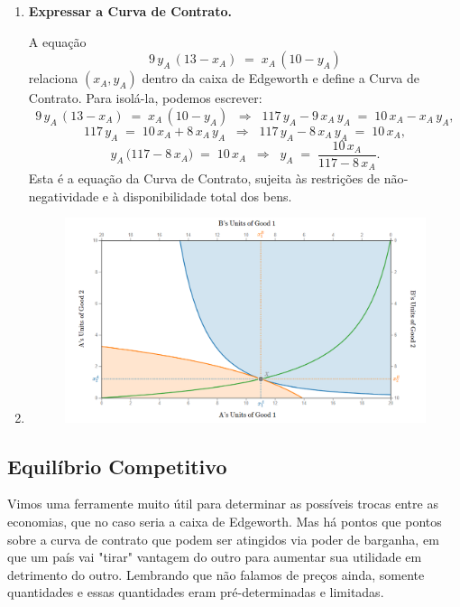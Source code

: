 \documentclass[a4paper,12pt]{article}[abntex2]
\begin{document}
\begin{enumerate}
    \item \textbf{Expressar a Curva de Contrato.}

    A equação
    \[
        9\,y_A\,(13 - x_A) 
        \;=\; 
        x_A\,(10 - y_A)
    \]
    relaciona \((x_A,y_A)\) dentro da caixa de Edgeworth e define a Curva de Contrato. Para isolá-la, podemos escrever:
    \[
        9\,y_A\,(13 - x_A) 
        \;=\; 
        x_A\,(10 - y_A)
        \;\;\Longrightarrow\;\;
        117\,y_A - 9\,x_A\,y_A 
        \;=\; 
        10\,x_A - x_A\,y_A,
    \]
    \[
        117\,y_A 
        \;=\; 
        10\,x_A + 8\,x_A\,y_A
        \;\;\Longrightarrow\;\;
        117\,y_A - 8\,x_A\,y_A 
        \;=\; 
        10\,x_A,
    \]
    \[
        y_A\,\bigl(117 - 8\,x_A\bigr)
        \;=\;
        10\,x_A
        \;\;\Longrightarrow\;\;
        y_A
        \;=\;
        \frac{10\,x_A}{117 - 8\,x_A}.
    \]
    Esta é a equação da Curva de Contrato, sujeita às restrições de não‐negatividade e à disponibilidade total dos bens.
    \item \begin{figure}[H]
    \centering
    \includegraphics[width=0.70\linewidth]{Imagens/a2i14.png}
\end{figure}
\end{enumerate}


\subsection{\textbf{Equilíbrio Competitivo}}

Vimos uma ferramente muito útil para determinar as possíveis trocas entre as economias, que no caso seria a caixa de Edgeworth. Mas há pontos que pontos sobre a curva de contrato que podem ser atingidos via poder de barganha, em que um país vai "tirar" vantagem do outro para aumentar sua utilidade em detrimento do outro. Lembrando que não falamos de preços ainda, somente quantidades e essas quantidades eram pré-determinadas e limitadas.
\end{document}
